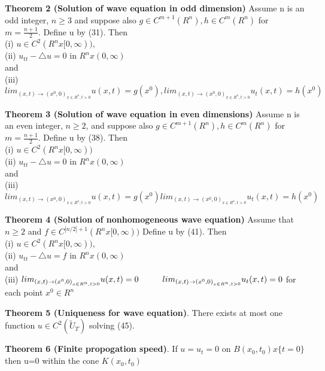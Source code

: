 \documentclass{article}
\newcommand\tab[1][1cm]{\hspace*{#1}}
\begin{document}
\textbf {Theorem 2 (Solution of wave equation in odd dimension)} Assume n is an odd integer, $n \geq 3$ and suppose also $g \in C^{m+1}(R^n), h \in C^m (R^n)$ for $m = \frac{n+1}{2}.$ Define u by (31). Then \\
\tab (i) $u \in C^2(R^n x [0, \infty)),$ \\
\tab (ii) $u_{tt} - \triangle u = 0$ in $R^n x (0, \infty)$ \\
and \\
\tab (iii) $lim_{{(x,t) \to (x^0, 0)}_{x \in R^n, t>0}} u(x,t) = g(x^0), lim_{{(x,t) \to (x^0, 0)}_{x \in R^n, t>0}} u_t(x,t) = h(x^0)$

\textbf {Theorem 3 (Solution of wave equation in even dimensions)} Assume n is an even integer, $n \geq 2$, and suppose also $g \in C^{m+1}(R^n), h \in C^m(R^n)$ for $m=\frac{n+1}{2}$. Define u by (38). Then \\
\tab (i) $u \in C^2(R^n x [0,\infty))$ \\
\tab (ii) $u_{tt} - \triangle u = 0$ \tab in $R^n x (0, \infty)$ \\
and \\
\tab (iii) $lim_{{(x,t) \to (x^0,0)}_{x \in R^n, t>0}} u(x,t) = g(x^0) lim_{{(x,t) \to (x^0,0)}_{x \in R^n, t>0}} u_t(x,t) = h(x^0)$

\textbf {Theorem 4 (Solution of nonhomogeneous wave equation)} Assume that $n \geq 2$ and $f \in C^{|n/2|+1}(R^n x [0, \infty))$ Define u by (41). Then \\
\tab (i) $u \in C^2(R^n x [0,\infty)),$ \\
\tab (ii) $u_{tt} - \triangle u = f$ \tab in $R^n x (0, \infty)$ \\
and \\
\tab (iii) $lim_{{(x,t) \to (x^0,0)}_{x \in R^n, t>0}} u(x,t) = 0 \tab lim_{{(x,t) \to (x^0,0)}_{x \in R^n, t>0}} u_t(x,t) = 0$ for each point $x^0 \in R^n$

\textbf {Theorem 5 (Uniqueness for wave equation)}. There exists at most one function $u \in C^2 (\tilde{U}_T)$ solving (45).

\textbf {Theorem 6 (Finite propogation speed)}. If $u = u_t = 0$ on $B(x_0, t_0) x \{t=0\}$ then u=0 within the cone $K(x_0, t_0)$
\end{document}
